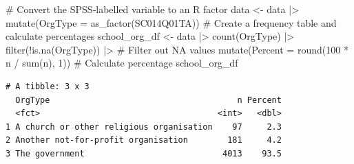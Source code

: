 \documentclass[
  letterpaper,
  DIV=11,
  numbers=noendperiod]{scrreprt}
\newenvironment{Shaded}{\begin{snugshade}}{\end{snugshade}}
\newcommand{\AttributeTok}[1]{\textcolor[rgb]{0.40,0.45,0.13}{#1}}
\newcommand{\CommentTok}[1]{\textcolor[rgb]{0.37,0.37,0.37}{#1}}
\newcommand{\DecValTok}[1]{\textcolor[rgb]{0.68,0.00,0.00}{#1}}
\newcommand{\FunctionTok}[1]{\textcolor[rgb]{0.28,0.35,0.67}{#1}}
\newcommand{\NormalTok}[1]{\textcolor[rgb]{0.00,0.23,0.31}{#1}}
\newcommand{\OtherTok}[1]{\textcolor[rgb]{0.00,0.23,0.31}{#1}}
\newcommand{\SpecialCharTok}[1]{\textcolor[rgb]{0.37,0.37,0.37}{#1}}
\begin{document}
\begin{Shaded}
\begin{Highlighting}[]
\CommentTok{\# Convert the SPSS‑labelled variable to an R factor }
\NormalTok{data }\OtherTok{\textless{}{-}}\NormalTok{ data }\SpecialCharTok{|\textgreater{}} \FunctionTok{mutate}\NormalTok{(}\AttributeTok{OrgType =} \FunctionTok{as\_factor}\NormalTok{(SC014Q01TA)) }
\CommentTok{\# Create a frequency table and calculate percentages }
\NormalTok{school\_org\_df }\OtherTok{\textless{}{-}}\NormalTok{ data }\SpecialCharTok{|\textgreater{}} 
  \FunctionTok{count}\NormalTok{(OrgType) }\SpecialCharTok{|\textgreater{}} 
  \FunctionTok{filter}\NormalTok{(}\SpecialCharTok{!}\FunctionTok{is.na}\NormalTok{(OrgType)) }\SpecialCharTok{|\textgreater{}} \CommentTok{\# Filter out NA values }
  \FunctionTok{mutate}\NormalTok{(}\AttributeTok{Percent =} \FunctionTok{round}\NormalTok{(}\DecValTok{100} \SpecialCharTok{*}\NormalTok{ n }\SpecialCharTok{/} \FunctionTok{sum}\NormalTok{(n), }\DecValTok{1}\NormalTok{)) }\CommentTok{\# Calculate percentage }
\NormalTok{school\_org\_df }
\end{Highlighting}
\end{Shaded}

\begin{verbatim}
# A tibble: 3 x 3
  OrgType                                      n Percent
  <fct>                                    <int>   <dbl>
1 A church or other religious organisation    97     2.3
2 Another not-for-profit organisation        181     4.2
3 The government                            4013    93.5
\end{verbatim}
\end{document}
